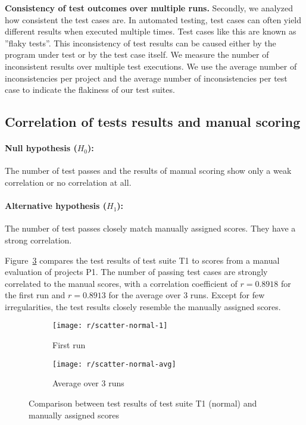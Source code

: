 \textbf{Consistency of test outcomes over multiple runs.}
Secondly, we analyzed how consistent the test cases are.
In automated testing, test cases can often yield different results when executed multiple times.
Test cases like this are known as ''flaky tests''.
This inconsistency of test results can be caused either by the program under test or by the test case itself.
We measure the number of inconsistent results over multiple test executions.
We use the average number of inconsistencies per project and the average number of inconsistencies per test case to
indicate the flakiness of our test suites.

\subsection{Correlation of tests results and manual scoring}

\paragraph{Null hypothesis ($H_0$):}
The number of test passes and the results of manual scoring show only a weak correlation or no correlation at all.
\vspace{-\medskipamount}
\paragraph{Alternative hypothesis ($H_1$):}
The number of test passes closely match manually assigned scores.
They have a strong correlation.
\parspace

\noindent Figure~\ref{fig:scatter_normal} compares the test results of test suite T1 to scores from a manual evaluation of projects P1.
The number of passing test cases are strongly correlated to the manual scores,
with a correlation coefficient of $r = 0.8918$ for the first run and $r = 0.8913$ for the average over 3 runs.
Except for few irregularities, the test results closely resemble the manually assigned scores.

\begin{figure}[htpb]
    \centering
    \begin{subfigure}{.50\textwidth}
        \texttt{[image: r/scatter-normal-1]}
        \caption{First run}
        \label{fig:scatter_normal_1}
    \end{subfigure}%
    \begin{subfigure}{.50\textwidth}
        \texttt{[image: r/scatter-normal-avg]}
        \caption{Average over 3 runs}
        \label{fig:scatter_normal_avg}
    \end{subfigure}
    \caption{Comparison between test results of test suite T1 (normal) and manually assigned scores}
    \label{fig:scatter_normal}
\end{figure}

